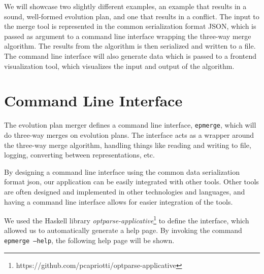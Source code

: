 \documentclass[a4paper,english]{ifimaster}
\begin{document}
We will showcase two slightly different examples, an example that results in a sound, well-formed evolution plan, and one that results in a conflict. The input to the merge tool is represented in the common serialization format JSON, which is passed as argument to a command line interface wrapping the three-way merge algorithm. The results from the algorithm is then serialized and written to a file. The command line interface will also generate data which is passed to a frontend visualization tool, which visualizes the input and output of the algorithm.

\section{Command Line Interface}%
\label{sec:command_line_interface}

The evolution plan merger defines a command line interface, \texttt{epmerge}, which will do three-way merges on evolution plans. The interface acts as a wrapper around the three-way merge algorithm, handling things like reading and writing to file, logging, converting between representations, etc. 

By designing a command line interface using the common data serialization format json, our application can be easily integrated with other tools. Other tools are often designed and implemented in other technologies and languages, and having a command line interface allows for easier integration of the tools.

We used the Haskell library \textit{optparse-applicative}\footnote{https://github.com/pcapriotti/optparse-applicative} to define the interface, which allowed us to automatically generate a help page. By invoking the command \texttt{epmerge --help}, the following help page will be shown.
\end{document}
